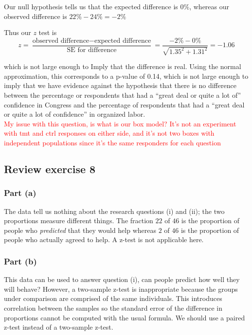 \documentclass[11pt]{article}
\begin{document}
\noindent Our null hypothesis tells us that the expected difference is $0\%$, whereas our observed difference is $22\% - 24\% = -2\%$

\noindent Thus our $z$ test is
$$z = \frac{\text{observed difference} - \text{expected difference}}{\text{SE for difference}} = \frac{ - 2\% - 0\%}{\sqrt{1.35^2 + 1.31^2}} = -1.06$$

\noindent which is not large enough to Imply that the difference is real. Using the normal approximation, this corresponds to a p-value of 0.14, which is not large enough to imply that we have evidence against the hypothesis that there is no difference between the percentage or respondents that had a ``great deal or quite a lot of''  confidence in Congress and the percentage of respondents that had a ``great deal or quite a lot of confidence'' in organized labor.\\

\noindent \textcolor{red}{My issue with this question, is what is our box model? It's not an experiment with tmt and ctrl responses on either side, and it's not two boxes with independent populations since it's the same responders for each question}





\subsection*{Review exercise 8} %
\subsubsection*{Part (a)}
The data tell us nothing about the research questions (i) and (ii); the two proportions measure different things.  The fraction $22$ of $46$ is the proportion of people who \textit{predicted} that they would help whereas $2$ of $46$ is the proportion of people who actually agreed to help.  A z-test is not applicable here.

\subsubsection*{Part (b)}
This data can be used to answer question (i), can people predict how well they will behave?  However, a two-sample z-test is inappropriate because the groups under comparison are comprised of the same individuals.  This introduces correlation between the samples so the standard error of the difference in proportions cannot be computed with the usual formula.  We should use a paired z-test instead of a two-sample z-test.
\end{document}
